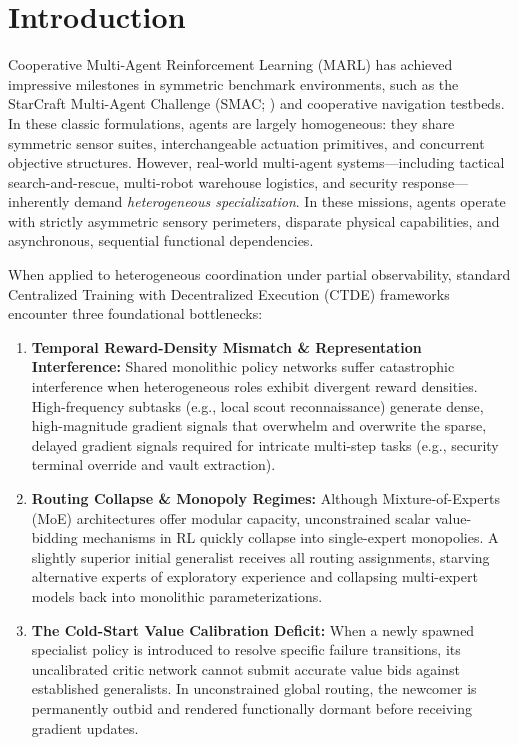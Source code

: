 \section{Introduction}
\label{sec:introduction}

Cooperative Multi-Agent Reinforcement Learning (MARL) has achieved impressive milestones in symmetric benchmark environments, such as the StarCraft Multi-Agent Challenge (SMAC; \citealp{yu2022surprising,rashid2020monotonic}) and cooperative navigation testbeds. In these classic formulations, agents are largely homogeneous: they share symmetric sensor suites, interchangeable actuation primitives, and concurrent objective structures. However, real-world multi-agent systems---including tactical search-and-rescue, multi-robot warehouse logistics, and security response---inherently demand \emph{heterogeneous specialization}. In these missions, agents operate with strictly asymmetric sensory perimeters, disparate physical capabilities, and asynchronous, sequential functional dependencies.

When applied to heterogeneous coordination under partial observability, standard Centralized Training with Decentralized Execution (CTDE) frameworks \citep{foerster2018counterfactual,kuba2022trust} encounter three foundational bottlenecks:
\begin{enumerate}[leftmargin=*,nosep]
    \item \textbf{Temporal Reward-Density Mismatch \& Representation Interference:} Shared monolithic policy networks suffer catastrophic interference when heterogeneous roles exhibit divergent reward densities. High-frequency subtasks (e.g., local scout reconnaissance) generate dense, high-magnitude gradient signals that overwhelm and overwrite the sparse, delayed gradient signals required for intricate multi-step tasks (e.g., security terminal override and vault extraction).
    \item \textbf{Routing Collapse \& Monopoly Regimes:} Although Mixture-of-Experts (MoE) architectures \citep{shazeer2017outrageously,fedus2022switch} offer modular capacity, unconstrained scalar value-bidding mechanisms in RL quickly collapse into single-expert monopolies. A slightly superior initial generalist receives all routing assignments, starving alternative experts of exploratory experience and collapsing multi-expert models back into monolithic parameterizations.
    \item \textbf{The Cold-Start Value Calibration Deficit:} When a newly spawned specialist policy is introduced to resolve specific failure transitions, its uncalibrated critic network cannot submit accurate value bids against established generalists. In unconstrained global routing, the newcomer is permanently outbid and rendered functionally dormant before receiving gradient updates.
\end{enumerate}

